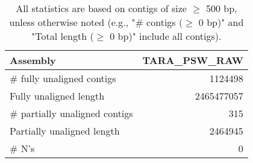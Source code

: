 \documentclass[12pt,a4paper]{article}
\begin{document}
\begin{table}[ht]
\begin{center}
\caption{All statistics are based on contigs of size $\geq$ 500 bp, unless otherwise noted (e.g., "\# contigs ($\geq$ 0 bp)" and "Total length ($\geq$ 0 bp)" include all contigs).}
\begin{tabular}{|l*{1}{|r}|}
\hline
Assembly & TARA\_PSW\_RAW \\ \hline
\# fully unaligned contigs & 1124498 \\ \hline
Fully unaligned length & 2465477057 \\ \hline
\# partially unaligned contigs & 315 \\ \hline
Partially unaligned length & 2464945 \\ \hline
\# N's & 0 \\ \hline
\end{tabular}
\end{center}
\end{table}
\end{document}
